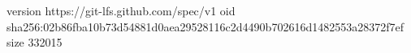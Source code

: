 version https://git-lfs.github.com/spec/v1
oid sha256:02b86fba10b73d54881d0aea29528116c2d4490b702616d1482553a28372f7ef
size 332015
